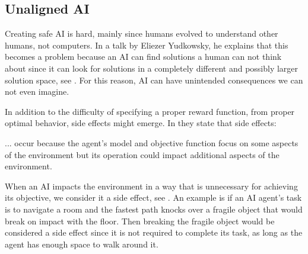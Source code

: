 \documentclass[12pt,A4]{report}
\theoremstyle{definition}
\begin{document}
\subsection{Unaligned AI}
Creating safe AI is hard, mainly since humans evolved to understand other humans, not computers. In a talk by Eliezer Yudkowsky, he explains that this becomes a problem because an AI can find solutions a human can not think about since it can look for solutions in a completely different and possibly larger solution space, see \citet{Yudkowsky16}. For this reason, AI can have unintended consequences we can not even imagine. 

In addition to the difficulty of specifying a proper reward function, from proper optimal behavior, side effects might emerge. In \citet{Saisubramanian} they state that side effects:
\begin{displayquote}
  ... occur because the agent's model and objective function focus on some aspects of the environment but its operation could impact additional aspects of the environment.
\end{displayquote}

When an AI impacts the environment in a way that is unnecessary for achieving its objective, we consider it a side effect, see \citet{Amodei}. An example is if an AI agent's task is to navigate a room and the fastest path knocks over a fragile object that would break on impact with the floor. Then breaking the fragile object would be considered a side effect since it is not required to complete its task, as long as the agent has enough space to walk around it. 
\end{document}
